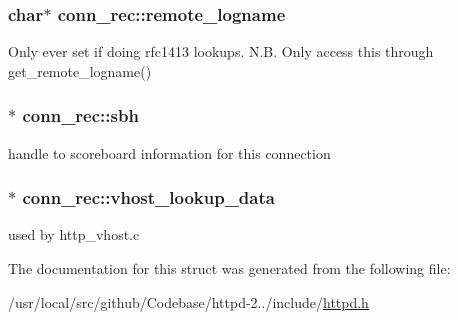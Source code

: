 \subsubsection[{\texorpdfstring{remote\+\_\+logname}{remote_logname}}]{\setlength{\rightskip}{0pt plus 5cm}char$\ast$ conn\+\_\+rec\+::remote\+\_\+logname}\hypertarget{structconn__rec_a0e9331e0c82b14e18fbb704657230867}{}\label{structconn__rec_a0e9331e0c82b14e18fbb704657230867}
Only ever set if doing rfc1413 lookups. N.\+B. Only access this through get\+\_\+remote\+\_\+logname() 
\subsubsection[{\texorpdfstring{sbh}{sbh}}]{$\ast$ conn\+\_\+rec\+::sbh}\hypertarget{structconn__rec_af0e434bcb2a0a47c13e94069431fb281}{}\label{structconn__rec_af0e434bcb2a0a47c13e94069431fb281}
handle to scoreboard information for this connection 
\subsubsection[{\texorpdfstring{vhost\+\_\+lookup\+\_\+data}{vhost_lookup_data}}]{$\ast$ conn\+\_\+rec\+::vhost\+\_\+lookup\+\_\+data}\hypertarget{structconn__rec_ad93afd204be704378f53e8dd4bc60b9d}{}\label{structconn__rec_ad93afd204be704378f53e8dd4bc60b9d}
used by http\+\_\+vhost.\+c 

The documentation for this struct was generated from the following file\+:\begin{DoxyCompactItemize}
\item 
/usr/local/src/github/\+Codebase/httpd-\/2../include/\hyperlink{httpd_8h}{httpd.\+h}\end{DoxyCompactItemize}
